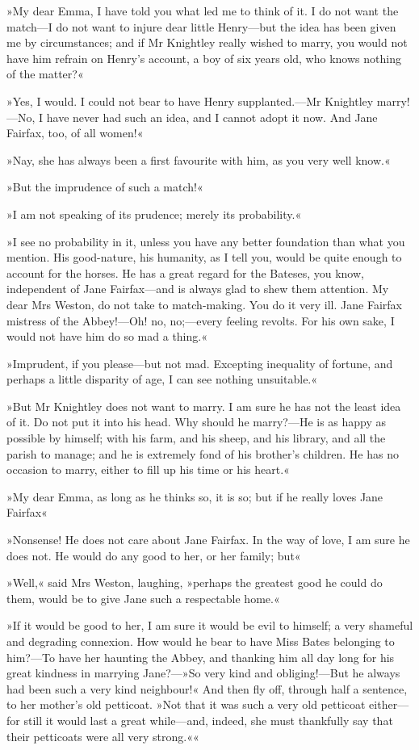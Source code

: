»My dear Emma, I have told you what led me to think of it. I do not want the match—I do not want to injure dear little Henry—but the idea has been given me by circumstances; and if Mr Knightley really wished to marry, you would not have him refrain on Henry's account, a boy of six years old, who knows nothing of the matter?«

»Yes, I would. I could not bear to have Henry supplanted.—Mr Knightley marry!—No, I have never had such an idea, and I cannot adopt it now. And Jane Fairfax, too, of all women!«

»Nay, she has always been a first favourite with him, as you very well know.«

»But the imprudence of such a match!«

»I am not speaking of its prudence; merely its probability.«

»I see no probability in it, unless you have any better foundation than what you mention. His good-nature, his humanity, as I tell you, would be quite enough to account for the horses. He has a great regard for the Bateses, you know, independent of Jane Fairfax—and is always glad to shew them attention. My dear Mrs Weston, do not take to match-making. You do it very ill. Jane Fairfax mistress of the Abbey!—Oh! no, no;—every feeling revolts. For his own sake, I would not have him do so mad a thing.«

»Imprudent, if you please—but not mad. Excepting inequality of fortune, and perhaps a little disparity of age, I can see nothing unsuitable.«

»But Mr Knightley does not want to marry. I am sure he has not the least idea of it. Do not put it into his head. Why should he marry?—He is as happy as possible by himself; with his farm, and his sheep, and his library, and all the parish to manage; and he is extremely fond of his brother's children. He has no occasion to marry, either to fill up his time or his heart.«

»My dear Emma, as long as he thinks so, it is so; but if he really loves Jane Fairfax\longdash«

»Nonsense! He does not care about Jane Fairfax. In the way of love, I am sure he does not. He would do any good to her, or her family; but\longdash«

»Well,« said Mrs Weston, laughing, »perhaps the greatest good he could do them, would be to give Jane such a respectable home.«

»If it would be good to her, I am sure it would be evil to himself; a very shameful and degrading connexion. How would he bear to have Miss Bates belonging to him?—To have her haunting the Abbey, and thanking him all day long for his great kindness in marrying Jane?—»So very kind and obliging!—But he always had been such a very kind neighbour!« And then fly off, through half a sentence, to her mother's old petticoat. »Not that it was such a very old petticoat either—for still it would last a great while—and, indeed, she must thankfully say that their petticoats were all very strong.««

